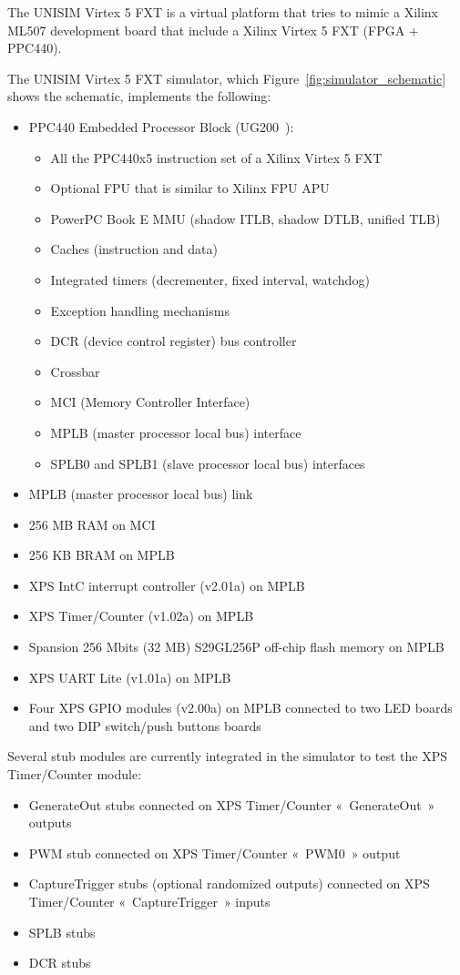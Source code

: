 The UNISIM Virtex 5 FXT is a virtual platform that tries to mimic a Xilinx ML507 development board that include a Xilinx Virtex 5 FXT (FPGA + PPC440).

\noindent The UNISIM Virtex 5 FXT simulator, which Figure~\ref{fig:simulator_schematic} shows the schematic, implements the following:
\begin{itemize}
	\item PPC440 Embedded Processor Block (UG200~\cite{UG200}):
		\begin{itemize}
			\item All the PPC440x5 \cite{PPC440x5} instruction set of a Xilinx Virtex 5 FXT
			\item Optional FPU that is similar to Xilinx FPU APU \cite{APU_FPU}
			\item PowerPC Book E MMU (shadow ITLB, shadow DTLB, unified TLB)
			\item Caches (instruction and data)
			\item Integrated timers (decrementer, fixed interval, watchdog)
			\item Exception handling mechanisms
			\item DCR (device control register) bus controller
			\item Crossbar
			\item MCI (Memory Controller Interface)
			\item MPLB (master processor local bus) interface
			\item SPLB0 and SPLB1 (slave processor local bus) interfaces
		\end{itemize}
	\item MPLB (master processor local bus) link
	\item 256 MB RAM on MCI
	\item 256 KB BRAM on MPLB
	\item XPS IntC interrupt controller (v2.01a) \cite{XPS_INTC} on MPLB
	\item XPS Timer/Counter (v1.02a) \cite{XPS_TIMER_COUNTER} on MPLB
	\item Spansion 256 Mbits (32 MB) S29GL256P off-chip flash memory \cite{S29GLP} on MPLB
	\item XPS UART Lite (v1.01a) \cite{XPS_UART_LITE} on MPLB
	\item Four XPS GPIO modules (v2.00a) \cite{XPS_GPIO} on MPLB connected to two LED boards and two DIP switch/push buttons boards
\end{itemize}

\noindent Several stub modules are currently integrated in the simulator to test the XPS Timer/Counter module:
\begin{itemize}
\item GenerateOut stubs connected on XPS Timer/Counter « GenerateOut » outputs
\item PWM stub connected on XPS Timer/Counter « PWM0 » output
\item CaptureTrigger stubs (optional randomized outputs) connected on XPS Timer/Counter « CaptureTrigger » inputs
\item SPLB stubs
\item DCR stubs
\end{itemize}

